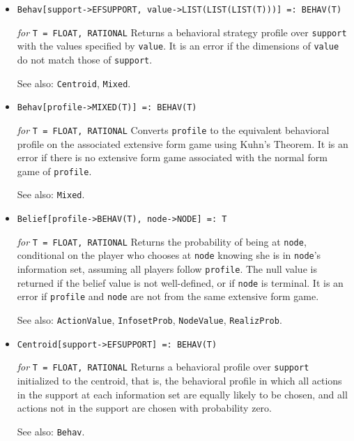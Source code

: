 \begin{itemize}


\item
\protect \large \begin{verbatim}
Behav[support->EFSUPPORT, value->LIST(LIST(LIST(T)))] =: BEHAV(T)
\end{verbatim}\normalsize

{\it for} {\tt T = FLOAT, RATIONAL}
\bd
Returns a behavioral strategy profile over \verb+support+ with the
values specified by \verb+value+.  It is an error if the dimensions of
\verb+value+ do not match those of \verb+support+.
\item [See also:] \verb+Centroid+, \verb+Mixed+.
\ed

\item
\protect \large \begin{verbatim}
Behav[profile->MIXED(T)] =: BEHAV(T)
\end{verbatim}\normalsize

{\it for} {\tt T = FLOAT, RATIONAL}
\bd
Converts \verb+profile+ to the equivalent behavioral profile on the
associated extensive form game using Kuhn's Theorem.  It is an error
if there is no extensive form game associated with the normal form game
of \verb+profile+.
\item [See also:] \verb+Mixed+.
\ed

\item
\protect \large \begin{verbatim}
Belief[profile->BEHAV(T), node->NODE] =: T
\end{verbatim}\normalsize

{\it for} {\tt T = FLOAT, RATIONAL}
\bd
Returns the probability of being at \verb+node+, conditional on the
player who chooses at \verb+node+ knowing she is in \verb+node+'s
information set, assuming all players follow \verb+profile+.  The null
value is returned if the belief value is not well-defined, or if
\verb+node+ is terminal.  It is an error if \verb+profile+ and \verb+node+
are not from the same extensive form game.
\item [See also:] \verb+ActionValue+, \verb+InfosetProb+, \verb+NodeValue+,
\verb+RealizProb+.
\ed



\item
\protect \large \begin{verbatim} 
Centroid[support->EFSUPPORT] =: BEHAV(T)
\end{verbatim}\normalsize

{\it for} {\tt T = FLOAT, RATIONAL}
\bd
Returns a behavioral profile over \verb+support+ initialized to the
centroid, that is, the behavioral profile in which all actions in the
support at each information set are equally likely to be chosen, and
all actions not in the support are chosen with probability zero.
\item [See also:] \verb+Behav+.
\ed


\end{itemize}
